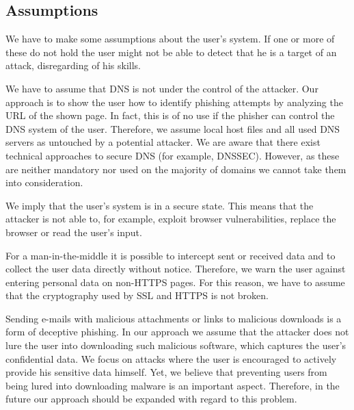 \subsection{Assumptions}
\label{s:assumptions}
We have to make some assumptions about the user's system. 
If one or more of these do not hold the user might not be able to detect that he is a target of an attack, disregarding of his skills.
\begin{description}[leftmargin=0cm]
	\item[Secure DNS:] We have to assume that DNS is not under the control of the attacker.
	Our approach is to show the user how to identify phishing attempts by analyzing the URL of the shown page.
	In fact, this is of no use if the phisher can control the DNS system of the user.
	Therefore, we assume local host files and all used DNS servers as untouched by a potential attacker.
	We are aware that there exist technical approaches to secure DNS (for example, DNSSEC). However, as these are neither mandatory nor used on the majority of domains we cannot take them into consideration.
	\item[Secure Smartphone:] We imply that the user's system is in a secure state.
	This means that the attacker is not able to, for example, exploit browser vulnerabilities, replace the browser or read the user's input.
	\item[Secure SSL:] 
	For a man-in-the-middle it is possible to intercept sent or received data and to collect the user data directly without notice.
	Therefore, we warn the user against entering personal data on non-HTTPS pages.
	For this reason, we have to assume that the cryptography used by SSL and HTTPS is not broken.
	\item[Malware:] 
	Sending e-mails with malicious attachments or links to malicious downloads is a form of deceptive phishing.
	In our approach we assume that the attacker does not lure the user into downloading such malicious software, which captures the user's confidential data.
	We focus on attacks where the user is encouraged to actively provide his sensitive data himself.
	Yet, we believe that preventing users from being lured into downloading malware is an important aspect.
	Therefore, in the future our approach should be expanded with regard to this problem.
\end{description}

